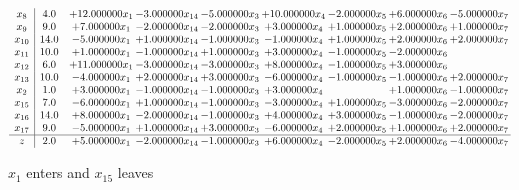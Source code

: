 \documentclass[10pt]{article}
\begin{document}
 \[\begin{array}{c| c c@{\hskip 2pt} c@{\hskip 2pt} c@{\hskip 2pt} c@{\hskip 2pt} c@{\hskip 2pt} c@{\hskip 2pt} c@{\hskip 2pt} }
 x_{8}   &  4.0 & + 12.000000 x_{1} & -3.000000 x_{14} & -5.000000 x_{3} & + 10.000000 x_{4} & -2.000000 x_{5} & + 6.000000 x_{6} & -5.000000 x_{7}\\
 x_{9}   &  9.0 & + 7.000000 x_{1} & -2.000000 x_{14} & -2.000000 x_{3} & + 3.000000 x_{4} & + 1.000000 x_{5} & + 2.000000 x_{6} & + 1.000000 x_{7}\\
 x_{10}   &  14.0 & -5.000000 x_{1} & + 1.000000 x_{14} & -1.000000 x_{3} & -1.000000 x_{4} & + 1.000000 x_{5} & + 2.000000 x_{6} & + 2.000000 x_{7}\\
 x_{11}   &  10.0 & + 1.000000 x_{1} & -1.000000 x_{14} & + 1.000000 x_{3} & + 3.000000 x_{4} & -1.000000 x_{5} & -2.000000 x_{6} &   \\
 x_{12}   &  6.0 & + 11.000000 x_{1} & -3.000000 x_{14} & -3.000000 x_{3} & + 8.000000 x_{4} & -1.000000 x_{5} & + 3.000000 x_{6} &   \\
 x_{13}   &  10.0 & -4.000000 x_{1} & + 2.000000 x_{14} & + 3.000000 x_{3} & -6.000000 x_{4} & -1.000000 x_{5} & -1.000000 x_{6} & + 2.000000 x_{7}\\
 x_{2}   &  1.0 & + 3.000000 x_{1} & -1.000000 x_{14} & -1.000000 x_{3} & + 3.000000 x_{4} &   & + 1.000000 x_{6} & -1.000000 x_{7}\\
 x_{15}   &  7.0 & -6.000000 x_{1} & + 1.000000 x_{14} & -1.000000 x_{3} & -3.000000 x_{4} & + 1.000000 x_{5} & -3.000000 x_{6} & -2.000000 x_{7}\\
 x_{16}   &  14.0 & + 8.000000 x_{1} & -2.000000 x_{14} & -1.000000 x_{3} & + 4.000000 x_{4} & + 3.000000 x_{5} & -1.000000 x_{6} & -2.000000 x_{7}\\
 x_{17}   &  9.0 & -5.000000 x_{1} & + 1.000000 x_{14} & + 3.000000 x_{3} & -6.000000 x_{4} & + 2.000000 x_{5} & + 1.000000 x_{6} & + 2.000000 x_{7}\\
\hline
z    &  2.0 & + 5.000000 x_{1} & -2.000000 x_{14} & -1.000000 x_{3} & + 6.000000 x_{4} & -2.000000 x_{5} & + 2.000000 x_{6} & -4.000000 x_{7}\\
\end{array}\]


 $ x_{1} $ enters and $ x_{15} $ leaves 
\end{document}
